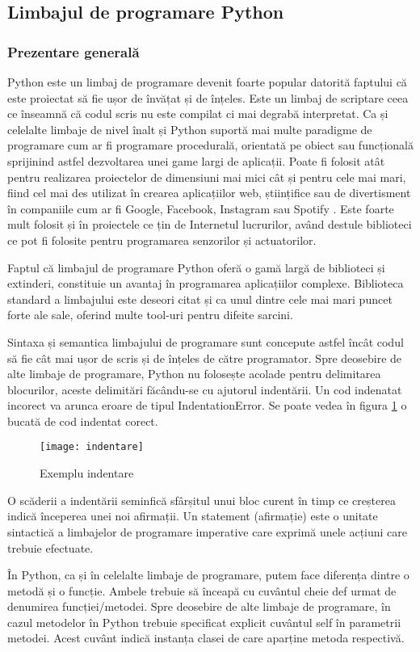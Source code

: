 \documentclass[../IoMusT.tex]{subfiles}
\begin{document}
\subsection{Limbajul de programare Python}
\subsubsection{Prezentare generală}
Python este un limbaj de programare devenit foarte popular datorită faptului că este proiectat să fie ușor de învățat și de înțeles. Este un limbaj de scriptare ceea ce înseamnă că codul scris nu este compilat ci mai degrabă interpretat. Ca și celelalte limbaje de nivel înalt și Python suportă mai multe paradigme de programare cum ar fi programare procedurală, orientată pe obiect sau funcțională sprijinind astfel dezvoltarea unei game largi de aplicații. Poate fi folosit atât pentru realizarea proiectelor de dimensiuni mai mici cât și pentru cele mai mari, fiind cel mai des utilizat în crearea aplicațiilor web, științifice sau de divertisment în companiile cum ar fi Google, Facebook, Instagram sau Spotify \cite{pythonWhere}. Este foarte mult folosit și în proiectele ce țin de Internetul lucrurilor, având destule biblioteci ce pot fi folosite pentru programarea senzorilor și actuatorilor.
\\
\par Faptul că limbajul de programare Python oferă o gamă largă de biblioteci și extinderi, constituie un avantaj în programarea aplicațiilor complexe. Biblioteca standard a limbajului este deseori citat și ca unul dintre cele mai mari puncet forte ale sale, oferind multe tool-uri pentru difeite sarcini.
\\
\par Sintaxa și semantica limbajului de programare sunt concepute astfel încât codul să fie cât mai ușor de scris și de înțeles de către programator. Spre deosebire de alte limbaje de programare, Python nu folosește acolade pentru delimitarea blocurilor, aceste delimitări făcându-se cu ajutorul indentării. Un cod indenatat incorect va arunca eroare de tipul IndentationError. Se poate vedea în figura \ref{fig:indent} o bucată de cod indentat corect.
\begin{figure}[h]
\centering
\texttt{[image: indentare]}
\caption{Exemplu indentare}
\label{fig:indent}
\end{figure}
O scăderii  a indentării  seminfică sfârșitul unui bloc curent în timp ce creșterea indică începerea unei noi afirmații. Un statement (afirmație) este o unitate sintactică a limbajelor de programare imperative care exprimă  unele acțiuni care trebuie efectuate.
\\
\par În Python, ca și în celelalte limbaje de programare, putem face diferența dintre o metodă și o funcție. Ambele trebuie să înceapă cu cuvântul cheie def urmat de denumirea funcției/metodei. Spre deosebire de alte limbaje de programare, în cazul metodelor în Python trebuie specificat explicit cuvântul self în parametrii metodei. Acest cuvânt indică instanța clasei de care aparține metoda respectivă.
\end{document}
